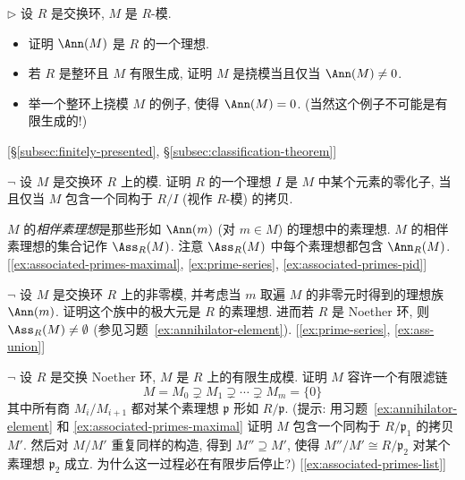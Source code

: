 \begin{prob}\label{ex:annihilator}
$\triangleright$ 设 $R$ 是交换环, $M$ 是 $R$-模.

\begin{itemize}
\item 证明 $\Ann(M)$ 是 $R$ 的一个理想.
\item 若 $R$ 是整环且 $M$ 有限生成, 证明 $M$ 是挠模当且仅当 $\Ann(M)\neq 0$.
\item 举一个整环上挠模 $M$ 的例子, 使得 $\Ann(M)=0$. (当然这个例子不可能是有限生成的!)
\end{itemize}

[§\ref{subsec:finitely-presented}, §\ref{subsec:classification-theorem}]
\end{prob}

\begin{prob}\label{ex:annihilator-element}
$\neg$ 设 $M$ 是交换环 $R$ 上的模. 证明 $R$ 的一个理想 $I$ 是 $M$ 中某个元素的零化子, 当且仅当 $M$ 包含一个同构于 $R/I$ (视作 $R$-模) 的拷贝.

$M$ 的\emph{相伴素理想}是那些形如 $\Ann(m)$ (对 $m\in M$) 的理想中的素理想. $M$ 的相伴素理想的集合记作 $\Ass_R(M)$. 注意 $\Ass_R(M)$ 中每个素理想都包含 $\Ann_R(M)$. [\ref{ex:associated-primes-maximal}, \ref{ex:prime-series}, \ref{ex:associated-primes-pid}]
\end{prob}

\begin{prob}\label{ex:associated-primes-maximal}
$\neg$ 设 $M$ 是交换环 $R$ 上的非零模, 并考虑当 $m$ 取遍 $M$ 的非零元时得到的理想族 $\Ann(m)$. 证明这个族中的极大元是 $R$ 的素理想. 进而若 $R$ 是 Noether 环, 则 $\Ass_R(M)\neq\emptyset$ (参见习题~\ref{ex:annihilator-element}). [\ref{ex:prime-series}, \ref{ex:ass-union}]
\end{prob}

\begin{prob}\label{ex:prime-series}
$\neg$ 设 $R$ 是交换 Noether 环, $M$ 是 $R$ 上的有限生成模. 证明 $M$ 容许一个有限滤链
$$
M=M_0 \supsetneq M_1 \supsetneq \cdots \supsetneq M_m=\{0\}
$$
其中所有商 $M_i/M_{i+1}$ 都对某个素理想 $\mathfrak{p}$ 形如 $R/\mathfrak{p}$. (提示: 用习题~\ref{ex:annihilator-element} 和 \ref{ex:associated-primes-maximal} 证明 $M$ 包含一个同构于 $R/\mathfrak{p}_1$ 的拷贝 $M'$. 然后对 $M/M'$ 重复同样的构造, 得到 $M''\supseteq M'$, 使得 $M''/M'\cong R/\mathfrak p_2$ 对某个素理想 $\mathfrak p_2$ 成立. 为什么这一过程必在有限步后停止?) [\ref{ex:associated-primes-list}]
\end{prob}


